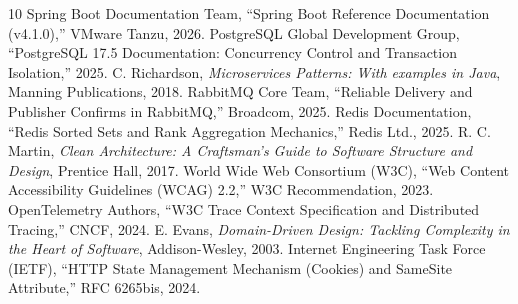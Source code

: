 \documentclass[conference,a4paper]{IEEEtran}
\begin{document}
\begin{thebibliography}{10}
 Spring Boot Documentation Team, ``Spring Boot Reference Documentation (v4.1.0),'' VMware Tanzu, 2026.
 PostgreSQL Global Development Group, ``PostgreSQL 17.5 Documentation: Concurrency Control and Transaction Isolation,'' 2025.
 C. Richardson, \textit{Microservices Patterns: With examples in Java}, Manning Publications, 2018.
 RabbitMQ Core Team, ``Reliable Delivery and Publisher Confirms in RabbitMQ,'' Broadcom, 2025.
 Redis Documentation, ``Redis Sorted Sets and Rank Aggregation Mechanics,'' Redis Ltd., 2025.
 R. C. Martin, \textit{Clean Architecture: A Craftsman's Guide to Software Structure and Design}, Prentice Hall, 2017.
 World Wide Web Consortium (W3C), ``Web Content Accessibility Guidelines (WCAG) 2.2,'' W3C Recommendation, 2023.
 OpenTelemetry Authors, ``W3C Trace Context Specification and Distributed Tracing,'' CNCF, 2024.
 E. Evans, \textit{Domain-Driven Design: Tackling Complexity in the Heart of Software}, Addison-Wesley, 2003.
 Internet Engineering Task Force (IETF), ``HTTP State Management Mechanism (Cookies) and SameSite Attribute,'' RFC 6265bis, 2024.
\end{thebibliography}
\end{document}
